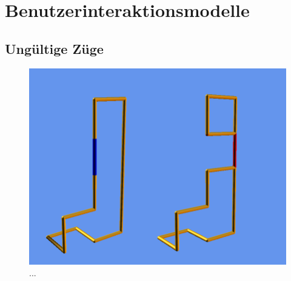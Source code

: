 \clearpage


\section{Benutzerinteraktionsmodelle}

	\begin{figure}[ht]
	  \centering
	  
	\end{figure}
	
%		  
	
%		  
	
	
%		  
	
\clearpage
	
\subsection{Ungültige Züge}

	\begin{figure}[htb]
	  \centering
	  \includegraphics[width = \textwidth]{Systemmodelle/Ungueltiger_Zug.png}
	  \caption{...}
	  \label{fig:zug1}
	\end{figure}

